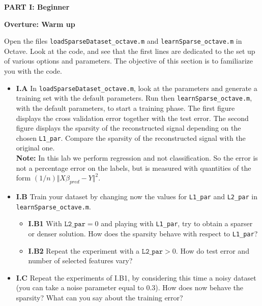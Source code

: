 \documentclass[DIN, pagenumber=false, fontsize=11pt, parskip=half]{scrartcl}
\newcommand{\mysection}[1]{\noindent\large\textbf{#1}}
\begin{document}
\newpage
\begin{center}
\large\textbf{PART I: Beginner}
\end{center}

\mysection{Overture: Warm up}

\noindent Open the files \texttt{loadSparseDataset\_octave.m} and \texttt{learnSparse\_octave.m} in Octave.
Look at the code, and see that the first lines are dedicated to the set up of various options and parameters.
The objective of this section is to familiarize you with the code.

\begin{itemize}
	\item \textbf{I.A} In \texttt{loadSparseDataset\_octave.m}, look at the parameters and generate a training set with the default parameters.
	Run then \texttt{learnSparse\_octave.m}, with the default parameters, to start a training phase.
	The first figure displays the cross validation error together with the test error.
	The second figure displays the sparsity of the reconstructed signal depending on the chosen \texttt{L1\_par}.
	Compare the sparsity of the reconstructed signal with the original one.\\
	\textbf{Note:} In this lab we perform regression and not classification. So the error is not a percentage error on the labels,  but is measured with quantities of the form $(1/n)\Vert X \beta_{pred} - Y \Vert^2$.

	\item \textbf{I.B} Train your dataset by changing now the values for \texttt{L1\_par} and \texttt{L2\_par} in \texttt{learnSparse\_octave.m}.
	\begin{itemize}
		\item \textbf{I.B1} With $\texttt{L2\_par}=0$ and playing with \texttt{L1\_par}, try to obtain a sparser or denser solution. How does the sparsity behave with respect to \texttt{L1\_par}?
		\item \textbf{I.B2} Repeat the experiment with a $\texttt{L2\_par}>0$. How do test error and number of selected features vary?
\end{itemize}

	\item \textbf{I.C} Repeat the experiments of I.B1, by considering this time a noisy dataset (you can take a noise parameter equal to 0.3).
	How does now behave the sparsity?
	What can you say about the training error?

\end{itemize}
\end{document}
